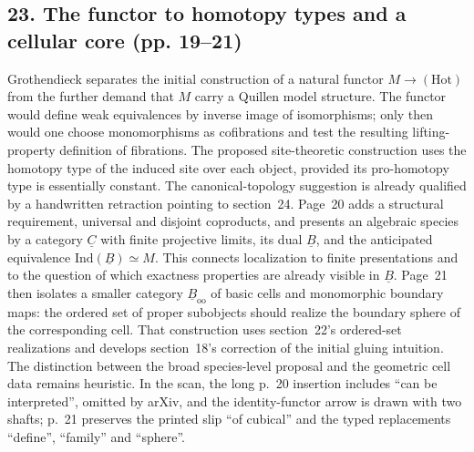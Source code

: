 \documentclass[10pt,oneside]{book}
\begin{document}
\subsection*{23. The functor to homotopy types and a cellular core (pp. 19--21)}
Grothendieck separates the initial construction of a natural functor $M\to(\mathrm{Hot})$ from the further demand that $M$ carry a Quillen model structure. The functor would define weak equivalences by inverse image of isomorphisms; only then would one choose monomorphisms as cofibrations and test the resulting lifting-property definition of fibrations. The proposed site-theoretic construction uses the homotopy type of the induced site over each object, provided its pro-homotopy type is essentially constant. The canonical-topology suggestion is already qualified by a handwritten retraction pointing to section~24. Page~20 adds a structural requirement, universal and disjoint coproducts, and presents an algebraic species by a category $\underline C$ with finite projective limits, its dual $\underline B$, and the anticipated equivalence $\mathrm{Ind}(\underline B)\simeq M$. This connects localization to finite presentations and to the question of which exactness properties are already visible in $\underline B$. Page~21 then isolates a smaller category $\underline B_{\mathrm{oo}}$ of basic cells and monomorphic boundary maps: the ordered set of proper subobjects should realize the boundary sphere of the corresponding cell. That construction uses section~22's ordered-set realizations and develops section~18's correction of the initial gluing intuition. The distinction between the broad species-level proposal and the geometric cell data remains heuristic. In the scan, the long p.~20 insertion includes ``can be interpreted'', omitted by arXiv, and the identity-functor arrow is drawn with two shafts; p.~21 preserves the printed slip ``of cubical'' and the typed replacements ``define'', ``family'' and ``sphere''.
\end{document}
